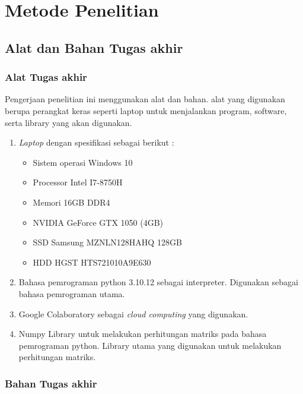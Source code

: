 \chapter{Metode Penelitian}
\section{Alat dan Bahan Tugas akhir}

\subsection{Alat Tugas akhir}

Pengerjaan penelitian ini menggunakan alat dan bahan. alat yang digunakan berupa perangkat keras seperti laptop untuk menjalankan program, software, serta library yang akan digunakan.

\begin{enumerate}
	\item \textit{Laptop} dengan spesifikasi sebagai berikut :
            \begin{itemize}
                \item Sistem operasi Windows 10
                \item {Processor} Intel I7-8750H
                \item Memori 16GB DDR4
                \item NVIDIA GeForce GTX 1050 (4GB)
                \item SSD Samsung MZNLN128HAHQ 128GB
                \item HDD HGST HTS721010A9E630
            \end{itemize}  
	\item Bahasa pemrograman python 3.10.12 sebagai interpreter. Digunakan sebagai bahasa pemrograman utama.
	\item Google Colaboratory sebagai \textit{cloud computing} yang digunakan.
	\item Numpy Library untuk melakukan perhitungan matriks pada bahasa pemrograman python. Library utama yang digunakan untuk melakukan perhitungan matriks.
\end{enumerate}

\subsection{Bahan Tugas akhir}


